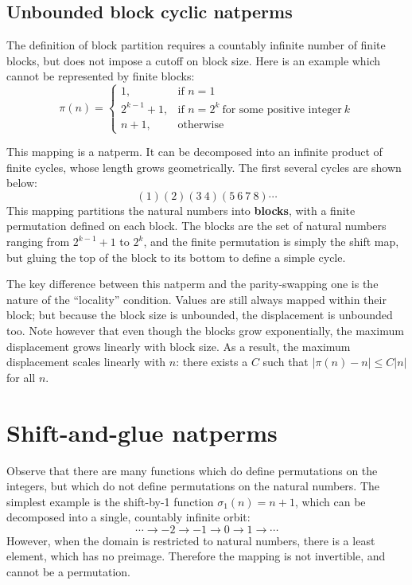 \documentclass[12pt,reqno]{article}
\begin{document}
\subsection{Unbounded block cyclic natperms}

The definition of block partition requires a countably infinite number of finite blocks, but does not impose a cutoff on block size. Here is an example which cannot be represented by finite blocks:
\begin{equation}
    \pi(n) = \begin{cases}
        1, & \text{if } n = 1 \\
        2^{k-1} + 1, & \text{if } n = 2^k \ \text{for some positive integer}\ k \\
        n + 1, & \text{otherwise}
    \end{cases}
\end{equation}

This mapping is a natperm. It can be decomposed into an infinite product of finite cycles, whose length grows geometrically. The first several cycles are shown below:
$$ (1)(2)(3 \ 4)(5 \ 6 \ 7 \ 8)\cdots $$ 
This mapping partitions the natural numbers into \textbf{blocks}, with a finite permutation defined on each block. The blocks are the set of natural numbers ranging from $2^{k-1} + 1$ to $2^k$, and the finite permutation is simply the shift map, but gluing the top of the block to its bottom to define a simple cycle.

The key difference between this natperm and the parity-swapping one is the nature of the ``locality'' condition. Values are still always mapped within their block; but because the block size is unbounded, the displacement is unbounded too. Note however that even though the blocks grow exponentially, the maximum displacement grows linearly with block size. As a result, the maximum displacement scales linearly with $n$: there exists a $C$ such that $|\pi(n) - n| \leq C |n|$ for all $n$.

\section{Shift-and-glue natperms}

Observe that there are many functions which do define permutations on the integers, but which do not define permutations on the natural numbers. The simplest example is the shift-by-1 function $\sigma_1(n) = n + 1$, which can be decomposed into a single, countably infinite orbit:
$$ \cdots \rightarrow -2 \rightarrow -1 \rightarrow 0 \rightarrow 1 \rightarrow \cdots $$
However, when the domain is restricted to natural numbers, there is a least element, which has no preimage. Therefore the mapping is not invertible, and cannot be a permutation.
\end{document}
